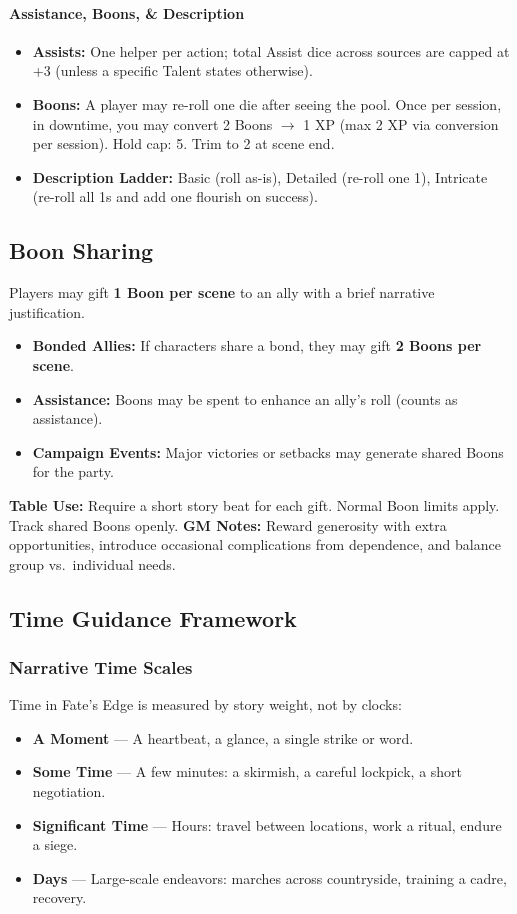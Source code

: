 \paragraph{Assistance, Boons, \& Description}
\begin{itemize}
  \item \textbf{Assists:} One helper per action; total Assist dice across sources are capped at +3 (unless a specific Talent states otherwise).
  \item \textbf{Boons:} A player may re-roll one die after seeing the pool. Once per session, in downtime, you may convert 2 Boons $\rightarrow$ 1 XP (max 2 XP via conversion per session). Hold cap: 5. Trim to 2 at scene end.
  \item \textbf{Description Ladder:} Basic (roll as-is), Detailed (re-roll one 1), Intricate (re-roll all 1s and add one flourish on success).
\end{itemize}

\subsection{Boon Sharing}

Players may gift \textbf{1 Boon per scene} to an ally with a brief narrative justification.  
\begin{itemize}
  \item \textbf{Bonded Allies:} If characters share a bond, they may gift \textbf{2 Boons per scene}.  
  \item \textbf{Assistance:} Boons may be spent to enhance an ally’s roll (counts as assistance).  
  \item \textbf{Campaign Events:} Major victories or setbacks may generate shared Boons for the party.  
\end{itemize}

\textbf{Table Use:} Require a short story beat for each gift. Normal Boon limits apply. Track shared Boons openly.  
\textbf{GM Notes:} Reward generosity with extra opportunities, introduce occasional complications from dependence, and balance group vs.\ individual needs.

\subsection{Time Guidance Framework}

\subsubsection{Narrative Time Scales}
Time in Fate's Edge is measured by story weight, not by clocks:
\begin{itemize}
  \item \textbf{A Moment} — A heartbeat, a glance, a single strike or word.
  \item \textbf{Some Time} — A few minutes: a skirmish, a careful lockpick, a short negotiation.
  \item \textbf{Significant Time} — Hours: travel between locations, work a ritual, endure a siege.
  \item \textbf{Days} — Large-scale endeavors: marches across countryside, training a cadre, recovery.
\end{itemize}

